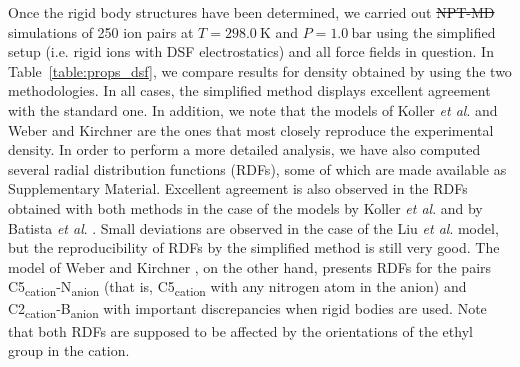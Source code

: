 \documentclass[3p,twocolumn]{elsarticle}
\providecommand{\DIFadd}[1]{{\protect\color{blue}\uwave{#1}}} %
\providecommand{\DIFdel}[1]{{\protect\color{red}\sout{#1}}}                      %
\providecommand{\DIFaddbegin}{} %
\providecommand{\DIFaddend}{} %
\providecommand{\DIFdelbegin}{} %
\providecommand{\DIFdelend}{} %
\newcommand{\DIFscaledelfig}{0.5}
\newlength{\DIFdelgraphicswidth} %
\newlength{\DIFdelgraphicsheight} %
\newcommand{\DIFaddincludegraphics}[2][]{{\color{blue}\fbox{\DIFOincludegraphics[#1]{#2}}}} %
\newcommand{\DIFdelincludegraphics}[2][]{%
\sbox{\DIFdelgraphicsbox}{\DIFOincludegraphics[#1]{#2}}%
\settoboxwidth{\DIFdelgraphicswidth}{\DIFdelgraphicsbox} %
\settoboxtotalheight{\DIFdelgraphicsheight}{\DIFdelgraphicsbox} %
\scalebox{\DIFscaledelfig}{%
\parbox[b]{\DIFdelgraphicswidth}{\usebox{\DIFdelgraphicsbox}\\[-\baselineskip] \rule{\DIFdelgraphicswidth}{0em}}\llap{\resizebox{\DIFdelgraphicswidth}{\DIFdelgraphicsheight}{%
\setlength{\unitlength}{\DIFdelgraphicswidth}%
\begin{picture}(1,1)%
\thicklines\linethickness{2pt} %
{\color[rgb]{1,0,0}\put(0,0){\framebox(1,1){}}}%
{\color[rgb]{1,0,0}\put(0,0){\line( 1,1){1}}}%
{\color[rgb]{1,0,0}\put(0,1){\line(1,-1){1}}}%
\end{picture}%
}\hspace*{3pt}}} %
} %
\DeclareRobustCommand{\DIFaddbegin}{\DIFOaddbegin \let\includegraphics\DIFaddincludegraphics} %
\DeclareRobustCommand{\DIFaddend}{\DIFOaddend \let\includegraphics\DIFOincludegraphics} %
\DeclareRobustCommand{\DIFdelbegin}{\DIFOdelbegin \let\includegraphics\DIFdelincludegraphics} %
\DeclareRobustCommand{\DIFdelend}{\DIFOaddend \let\includegraphics\DIFOincludegraphics} %
\begin{document}
Once the rigid body structures have been determined, we carried out \DIFdelbegin \DIFdel{NPT-MD }\DIFdelend \DIFaddbegin \DIFadd{NpT-MD }\DIFaddend simulations of 250 ion pairs at $T = 298.0~\mathrm{K}$ and \DIFdelbegin \DIFdel{$P = 1.0~\mathrm{bar}$ }\DIFdelend \DIFaddbegin \DIFadd{$p = 0.1~\mathrm{MPa}$ }\DIFaddend using the simplified setup (i.e. rigid ions with DSF electrostatics) and all force fields in question.
In Table~\ref{table:props_dsf}, we compare results for density obtained by using the two methodologies.
In all cases, the simplified method displays excellent agreement with the standard one.
In addition, we note that the models of Koller \textit{et al}. \cite{Koller_2012} and Weber and Kirchner \cite{Weber_2016} are the ones that most closely reproduce the experimental density.
In order to perform a more detailed analysis, we have also computed several radial distribution functions (RDFs), some of which are made available as Supplementary Material.
Excellent agreement is also observed in the RDFs obtained with both methods in the case of the models by Koller \textit{et al}. \cite{Koller_2012} and by Batista \textit{et al}. \cite{Batista_2015}.
Small deviations are observed in the case of the Liu \textit{et al}. \cite{Liu_2014} model, but the reproducibility of RDFs by the simplified method is still very good.
The model of Weber and Kirchner \cite{Weber_2016}, on the other hand, presents RDFs for the pairs C5\textsubscript{cation}-N\textsubscript{anion} (that is, C5\textsubscript{cation} with any nitrogen atom in the anion) and C2\textsubscript{cation}-B\textsubscript{anion} with important discrepancies when rigid bodies are used.
Note that both RDFs are supposed to be affected by the orientations of the ethyl group in the cation.
\end{document}
